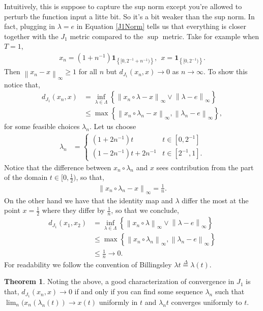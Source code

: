 \documentclass[12pt]{article}
\newcommand\norm[1]{\left\lVert#1\right\rVert}
\newcommand{\define}{\overset{\Delta}{=}}
\theoremstyle{definition}
\newtheorem{theorem}{Theorem}
\theoremstyle{definition}
\theoremstyle{definition}
\begin{document}
Intuitively, this is suppose to capture the sup norm except you're allowed to perturb the function input a litte bit. So it's a bit weaker than the sup norm. In fact, plugging in $\lambda=e$ in Equation \ref{J1Norm} tells us that everything is closer together with the $J_1$ metric compared to the $\sup$ metric. Take for example when $T=1$,
\begin{align*}
x_n=(1+n^{-1})\bm{1}_{\left\{[0,2^{-1}+n^{-1})\right\}}, \ \ x = \bm{1}_{\left\{[0,2^{-1})\right\}}.
\end{align*}
Then $\norm{x_n-x}_{\infty}\geq 1$ for all $n$ but $d_{J_1}(x_n,x)\rightarrow 0$ as $n\rightarrow\infty$. To show this notice that,
\begin{align*}
d_{J_1}(x_n,x)&=\inf_{\lambda\in \Lambda}\left\{\norm{x_n\circ \lambda - x}_\infty \lor \norm{\lambda-e}_{\infty}\right\}\\
&\leq \max\left\{\norm{x_n\circ \lambda_n-x}_\infty, \norm{\lambda_n-e}_{\infty}\right\},
\end{align*}
for some feasible choices $\lambda_n$. Let us choose 
\begin{align*}
\lambda_n&=\begin{cases} (1+2n^{-1})t & t\in [0,2^{-1}]\\
(1-2n^{-1})t + 2n^{-1}& t\in [2^{-1},1].
\end{cases}
\end{align*}
Notice that the difference between $x_n\circ \lambda_n$ and $x$ sees contribution from the part of the domain $t\in[0,\frac{1}{2})$, so that,
\begin{align*}
\norm{x_n\circ \lambda_n-x}_{\infty}= \frac{1}{n}.
\end{align*}
On the other hand we have that the identity map and $\lambda$ differ the most at the point $x=\frac{1}{2}$ where they differ by $\frac{1}{n}$, so that we conclude,
\begin{align*}
d_{J_1}(x_1,x_2)&=\inf_{\lambda\in \Lambda}\left\{\norm{x_n\circ \lambda}_\infty \lor \norm{\lambda-e}_{\infty}\right\}\\
&\leq \max\left\{\norm{x_n\circ \lambda_n}_\infty, \norm{\lambda_n-e}_{\infty}\right\}\\
&\leq \frac{1}{n}\rightarrow0.
\end{align*}
For readability we follow the convention of Billingsley $\lambda t\define \lambda(t)$. 
\begin{theorem} Noting the above, a good characterization of convergence in $J_1$ is that,
$d_{J_1}(x_n,x)\rightarrow 0 $ if and only if you can find some sequence $\lambda_n$ such that $\lim_n (x_n(\lambda_n(t))\rightarrow x(t)$  uniformly in $t$ and $\lambda_nt$ converges uniformly to $t$.
\end{theorem}
\end{document}
